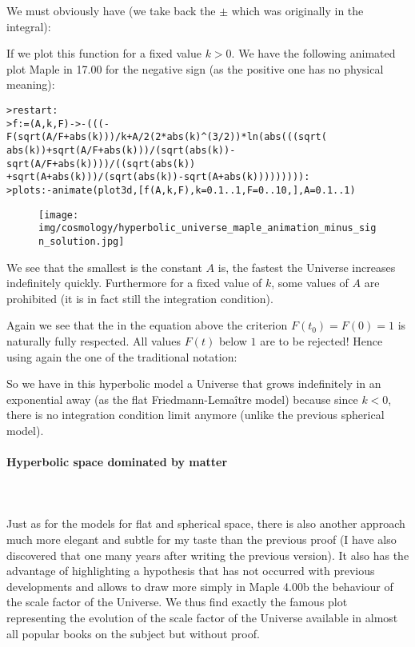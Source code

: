	We must obviously have (we take back the $\pm$ which was originally in the integral):
	
	If we plot this function for a fixed value $k>0$. We have the following  animated plot Maple in 17.00 for the negative sign (as the positive one has no physical meaning):
	
	\texttt{>restart:\\
	>f:=(A,k,F)->-(((-F(sqrt(A/F+abs(k)))/k+A/2(2*abs(k)\string^(3/2))*ln(abs(((sqrt(\\
	abs(k))+sqrt(A/F+abs(k)))/(sqrt(abs(k))-sqrt(A/F+abs(k))))/((sqrt(abs(k))\\
	+sqrt(A+abs(k)))/(sqrt(abs(k))-sqrt(A+abs(k))))))))):\\
	>plots:-animate(plot3d,[f(A,k,F),k=0.1..1,F=0..10,],A=0.1..1)
	}
	\begin{figure}[H]
		\centering
		\texttt{[image: img/cosmology/hyperbolic\_universe\_maple\_animation\_minus\_sign\_solution.jpg]}
	\end{figure}
	We see that the smallest is the constant $A$ is, the fastest the Universe increases indefinitely quickly. Furthermore for a fixed value of $k$, some values of $A$ are prohibited (it is in fact still the integration condition).

	Again we see that the in the equation above the criterion $F(t_0)=F(0)=1$ is naturally fully respected. All values $F (t) $ below $1$ are to be rejected! Hence using again the one of the traditional notation:
	
	So we have in this hyperbolic model a Universe that grows indefinitely in an exponential away (as the flat Friedmann-Lemaître model) because since $k<0$, there is no integration condition limit anymore (unlike the previous spherical model).
	
	\paragraph{Hyperbolic space dominated by matter}\mbox{}\\\\
	Just as for the models for flat and spherical space, there is also another approach much more elegant and subtle for my taste than the previous proof (I have also discovered that one many years after writing the previous version). It also has the advantage of highlighting a hypothesis that has not occurred with previous developments and allows to draw more simply in Maple 4.00b the behaviour of the scale factor of the Universe. We thus find exactly the famous plot representing the evolution of the scale factor of the Universe available in almost all popular books on the subject but without proof.

